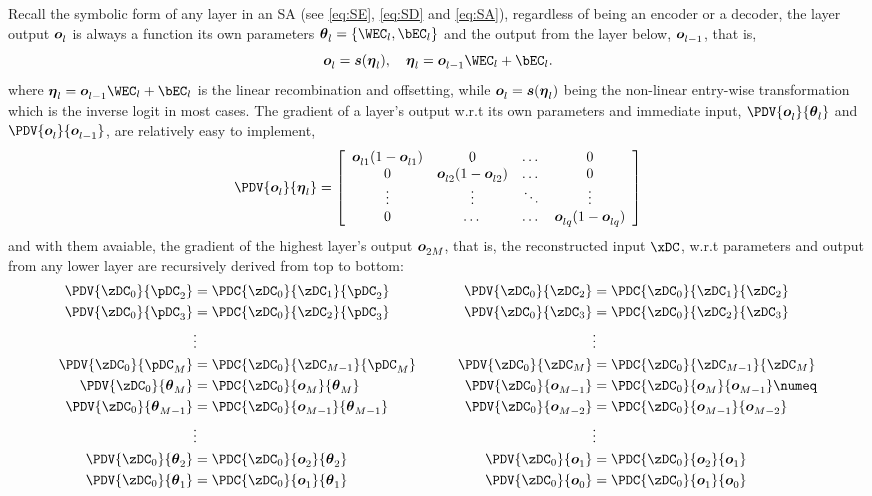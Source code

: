 Recall the symbolic form of any layer in an SA (see \ref{eq:SE}, \ref{eq:SD} and \ref{eq:SA}), regardless of being an encoder or a decoder, the layer output $\boldsymbol{o}_{l}^{}$ is always a function its own parameters $\bi{l} = \{\WEC_l, \bEC_l\}$ and the output from the layer below, $\boldsymbol{o}_{l-1}^{}$, that is,
\[ \oi{l} = \si(\ei{l}), \quad \ei{l} = \oi{l-1} \WEC_l + \bEC_l. \]
where $\ei{l} = \oi{l-1} \WEC_l + \bEC_l$ is the linear recombination and offsetting, while $\boldsymbol{o}_{l}^{} = \boldsymbol{s}(\boldsymbol{\eta}_{l}^{})$ being the non-linear entry-wise transformation which is the inverse logit in most cases. The gradient of a layer's output w.r.t its own parameters and immediate input, $\PDV{\oi{l}}{\bi{l}}$ and $\PDV{\oi{l}}{\oi{l-1}}$, are relatively easy to implement, 
\begin{equation*}
  \PDV{\oi{l}}{\ei{l}} = 
  \left[\begin{array}{cccc}
          \oi{l1}(1-\oi{l1}) & 0                  & \dots  & 0 \\
          0                  & \oi{l2}(1-\oi{l2}) & \dots  & 0 \\
          \vdots             & \vdots             & \ddots & \vdots \\
          0                  & \dots              & \dots  & \oi{lq}(1-\oi{lq})
    \end{array}\right]
\end{equation*}
and with them avaiable, the gradient of the highest layer's output $\boldsymbol{o}_{2M}^{}$, that is, the reconstructed input $\xDC$, w.r.t parameters and output from any lower layer are recursively derived from top to bottom:
\newcommand{\SEP}{\qquad}
\newcommand{\PDT}[3]{\PDV{#1}{#2}\PDV{#2}{#3}}
\newcommand{\BPI}[4][\zDC_0]{\PDV{#1}{#2} &= \PDC{#1}{#4}{#2} & \qquad \PDV{#1}{#3} &= \PDC{#1}{#4}{#3}}
\newcommand{\DOT}            {             &  \vdots           &                     &  \vdots}
\begin{align*}
  \BPI{\pDC_2}{\zDC_2}{\zDC_1} \\
  \BPI{\pDC_3}{\zDC_3}{\zDC_2} \\
  \DOT \\
  \BPI{\pDC_M}{\zDC_M}{\zDC_{M-1}} \\
  \BPI{\bi{ M  }}{\oi{ M-1}}{\oi{ M  }} \numeq \label{eq:BP} \\
  \BPI{\bi{ M-1}}{\oi{ M-2}}{\oi{ M-1}} \\
  \DOT \\
  \BPI{\bi{ 2  }}{\oi{ 1  }}{\oi{ 2  }} \\
  \BPI{\bi{ 1  }}{\oi{ 0  }}{\oi{ 1  }} \\
\end{align*}


